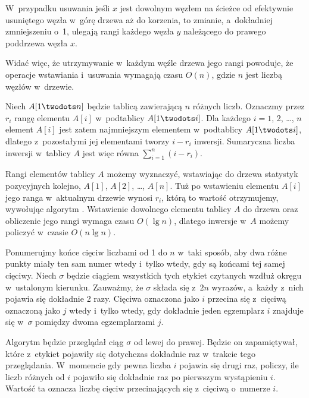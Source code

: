 W~przypadku usuwania jeśli $x$ jest dowolnym węzłem na ścieżce od efektywnie usuniętego węzła w~górę drzewa aż do korzenia, to zmianie, a~dokładniej zmniejszeniu o~1, ulegają rangi każdego węzła $y$ należącego do prawego poddrzewa węzła $x$.

Widać więc, że utrzymywanie w~każdym węźle drzewa jego rangi powoduje, że operacje wstawiania i~usuwania wymagają czasu $O(n)$, gdzie $n$ jest liczbą węzłów w~drzewie.

\exercise %
Niech $A[1\twodots n]$ będzie tablicą zawierającą $n$ różnych liczb.
Oznaczmy przez $r_i$ rangę elementu $A[i]$ w~podtablicy $A[1\twodots i]$.
Dla każdego $i=1$, 2, \dots, $n$ element $A[i]$ jest zatem  najmniejszym elementem w~podtablicy $A[1\twodots i]$, dlatego z~pozostałymi jej elementami tworzy $i-r_i$ inwersji.
Sumaryczna liczba inwersji w~tablicy $A$ jest więc równa $\sum_{i=1}^n(i-r_i)$.

Rangi elementów tablicy $A$ możemy wyznaczyć, wstawiając do drzewa statystyk pozycyjnych kolejno, $A[1]$, $A[2]$, \dots, $A[n]$.
Tuż po wstawieniu elementu $A[i]$ jego ranga w~aktualnym drzewie wynosi $r_i$, którą to wartość otrzymujemy, wywołując algorytm .
Wstawienie dowolnego elementu tablicy $A$ do drzewa oraz obliczenie jego rangi wymaga czasu $O(\lg n)$, dlatego inwersje w~$A$ możemy policzyć w~czasie $O(n\lg n)$.

\exercise %
Ponumerujmy końce cięciw liczbami od 1 do $n$ w~taki sposób, aby dwa różne punkty miały ten sam numer wtedy i~tylko wtedy, gdy są końcami tej samej cięciwy.
Niech $\sigma$ będzie ciągiem wszystkich tych etykiet czytanych wzdłuż okręgu w~ustalonym kierunku.
Zauważmy, że $\sigma$ składa się z~$2n$ wyrazów, a~każdy z~nich pojawia się dokładnie 2 razy.
Cięciwa oznaczona jako $i$ przecina się z~cięciwą oznaczoną jako $j$ wtedy i~tylko wtedy, gdy dokładnie jeden egzemplarz $i$ znajduje się w~$\sigma$ pomiędzy dwoma egzemplarzami $j$.

Algorytm będzie przeglądał ciąg $\sigma$ od lewej do prawej.
Będzie on zapamiętywał, które z~etykiet pojawiły się dotychczas dokładnie raz w~trakcie tego przeglądania.
W~momencie gdy pewna liczba $i$ pojawia się drugi raz, policzy, ile liczb różnych od $i$ pojawiło się dokładnie raz po pierwszym wystąpieniu $i$.
Wartość ta oznacza liczbę cięciw przecinających się z~cięciwą o~numerze $i$.

